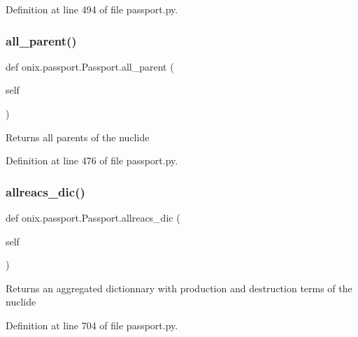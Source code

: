 Definition at line 494 of file passport.\+py.

\mbox{\label{classonix_1_1passport_1_1Passport_abd9b45bbdbbfa0e3bc75d7074948d3b1}} 
\subsubsection{\texorpdfstring{all\+\_\+parent()}{all\_parent()}}
{\footnotesize\ttfamily def onix.\+passport.\+Passport.\+all\+\_\+parent (\begin{DoxyParamCaption}\item[{}]{self }\end{DoxyParamCaption})}

\begin{DoxyVerb}Returns all parents of the nuclide\end{DoxyVerb}
 

Definition at line 476 of file passport.\+py.

\mbox{\label{classonix_1_1passport_1_1Passport_a28f60bf6ea7bc37eeb5ebc43628de197}} 
\subsubsection{\texorpdfstring{allreacs\+\_\+dic()}{allreacs\_dic()}}
{\footnotesize\ttfamily def onix.\+passport.\+Passport.\+allreacs\+\_\+dic (\begin{DoxyParamCaption}\item[{}]{self }\end{DoxyParamCaption})}

\begin{DoxyVerb}Returns an aggregated dictionnary with production and destruction terms of the nuclide\end{DoxyVerb}
 

Definition at line 704 of file passport.\+py.

\mbox{\label{classonix_1_1passport_1_1Passport_a63204bdcdd9f74bcc112ea1e7344390a}} 
